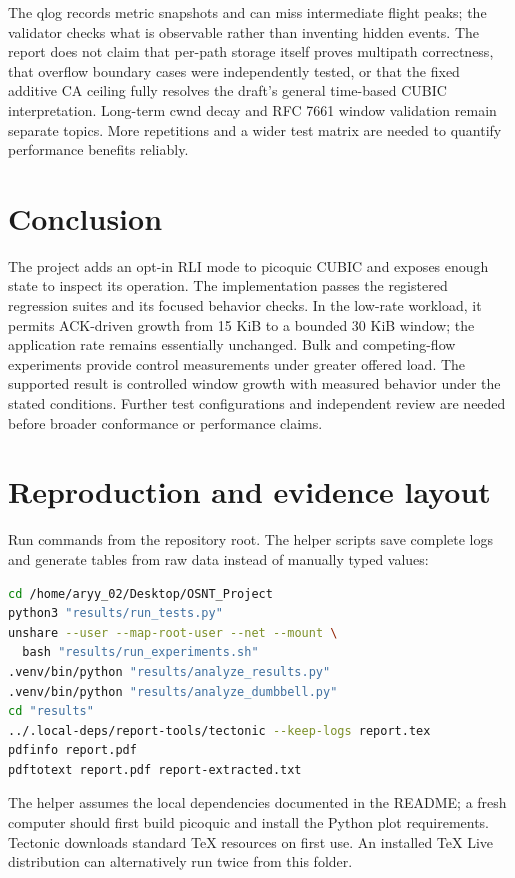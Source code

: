 \documentclass[11pt,a4paper]{article}
\newcommand{\code}[1]{\texttt{\detokenize{#1}}}
\begin{document}
The qlog records metric snapshots and can miss intermediate flight peaks;
the validator checks what is observable rather than inventing hidden
events. The report does not claim that per-path storage itself proves
multipath correctness, that overflow boundary cases were independently
tested, or that the fixed additive CA ceiling fully resolves the draft's
general time-based CUBIC interpretation. Long-term cwnd decay and RFC 7661
window validation remain separate topics. More repetitions and a wider
test matrix are needed to quantify performance benefits reliably.

\section{Conclusion}
The project adds an opt-in RLI mode to picoquic CUBIC and exposes enough
state to inspect its operation. The implementation passes the registered
regression suites and its focused behavior checks. In the low-rate workload,
it permits ACK-driven growth from 15 KiB to a bounded 30 KiB window;
the application rate remains essentially unchanged. Bulk and competing-flow
experiments provide control measurements under greater offered load.
The supported result is controlled window growth with measured behavior
under the stated conditions. Further test configurations and independent
review are needed before broader conformance or performance claims.

\section{Reproduction and evidence layout}
Run commands from the repository root. The helper scripts save complete
logs and generate tables from raw data instead of manually typed values:
\begin{lstlisting}[language=bash]
cd /home/aryy_02/Desktop/OSNT_Project
python3 "results/run_tests.py"
unshare --user --map-root-user --net --mount \
  bash "results/run_experiments.sh"
.venv/bin/python "results/analyze_results.py"
.venv/bin/python "results/analyze_dumbbell.py"
cd "results"
../.local-deps/report-tools/tectonic --keep-logs report.tex
pdfinfo report.pdf
pdftotext report.pdf report-extracted.txt
\end{lstlisting}
The helper assumes the local dependencies documented in the README; a
fresh computer should first build picoquic and install the Python plot
requirements. Tectonic downloads standard TeX resources on first use.
An installed TeX Live distribution can alternatively run
\code{pdflatex report.tex} twice from this folder.
\end{document}
